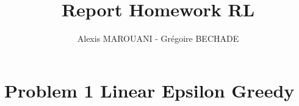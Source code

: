 \documentclass{article}
\title{Report Homework RL }
\author{Alexis MAROUANI - Grégoire BECHADE }
\begin{document}
\maketitle

\section{Problem 1 Linear Epsilon Greedy}
\end{document}
